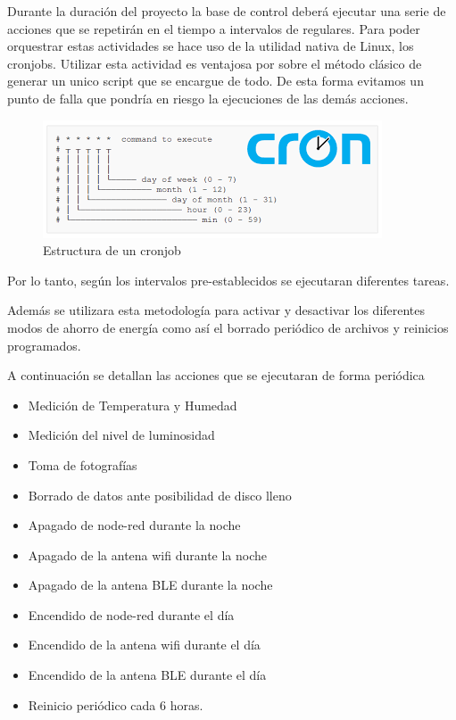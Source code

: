 Durante la duración del proyecto la base de control deberá ejecutar una serie de acciones que se repetirán en el tiempo a intervalos de regulares. Para poder orquestrar estas actividades se hace uso de la utilidad nativa de Linux, los cronjobs. 
Utilizar esta actividad es ventajosa por sobre el método clásico de generar un unico script que se encargue de todo. De esta forma evitamos un punto de falla que pondría en riesgo la ejecuciones de las demás acciones. 

\begin{figure}[H]
	\centering
	\includegraphics[width=0.7\linewidth]{"../Ingenieria de Detalle/ImagenesIngenieria de Detalle/cron"}
	\caption{Estructura de un cronjob}
	\label{fig:cron}
\end{figure}

Por lo tanto, según los intervalos pre-establecidos se ejecutaran diferentes tareas.

Además se utilizara esta metodología para activar y desactivar los diferentes modos de ahorro de energía como así el borrado periódico de archivos y reinicios programados.

A continuación se detallan las acciones que se ejecutaran de forma periódica  
\begin{itemize}
	\item Medición de Temperatura y Humedad
	\item Medición del nivel de luminosidad
	\item Toma de fotografías
	\item Borrado de datos ante posibilidad de disco lleno
	\item Apagado de node-red durante la noche
	\item Apagado de la antena wifi durante la noche
	\item Apagado de la antena BLE durante la noche
	\item Encendido de node-red durante el día
	\item Encendido de la antena wifi durante el día
	\item Encendido de la antena BLE durante el día
	\item Reinicio periódico cada 6 horas.
\end{itemize}










